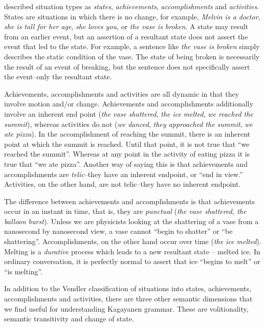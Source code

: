 \citet{vendler1957} described situation types as \textit{states}, \textit{achievements}, \textit{accomplishments} and \textit{activities}. States are situations in which there is no change, for example, \textit{Melvin is a doctor}, \textit{she is tall for her age}, \textit{she loves you}, or \textit{the vase is broken}. A state may result from an earlier event, but an assertion of a resultant state does not assert the event that led to the state. For example, a sentence like \textit{the vase is broken} simply describes the static condition of the vase. The state of being broken is necessarily the result of an event of breaking, but the sentence does not specifically assert the event--only the resultant state.

Achievements, accomplishments and activities are all dynamic in that they involve motion and/or change. Achievements and accomplishments additionally involve an inherent end point (\textit{the vase shattered}, \textit{the ice} \textit{melted}, \textit{we reached the summit}), whereas activities do not (\textit{we danced}, \textit{they approached the summit}, \textit{we ate pizza}). In the accomplishment of reaching the summit, there is an inherent point at which the summit is reached. Until that point, it is not true that “we reached the summit”. Whereas at any point in the activity of eating pizza it is true that “we ate pizza”. Another way of saying this is that achievements and accomplishments are \textit{telic}--they have an inherent endpoint, or “end in view.” Activities, on the other hand, are not telic--they have no inherent endpoint.

The difference between achievements and accomplishments is that achievements occur in an instant in time, that is, they are \textit{punctual} (\textit{the vase shattered, the balloon burst}). Unless we are physicists looking at the shattering of a vase from a nanosecond by nanosecond view, a vase cannot “begin to shatter” or “be shattering”. Accomplishments, on the other hand occur over time (\textit{the ice melted}). Melting is a \textit{durative} process which leads to a new resultant state – melted ice. In ordinary conversation, it is perfectly normal to assert that ice “begins to melt” or “is melting”.

In addition to the Vendler classification of situations into states, achievements, accomplishments and activities, there are three other semantic dimensions that we find useful for understanding Kagayanen grammar. These are volitionality, semantic transitivity and change of state.

